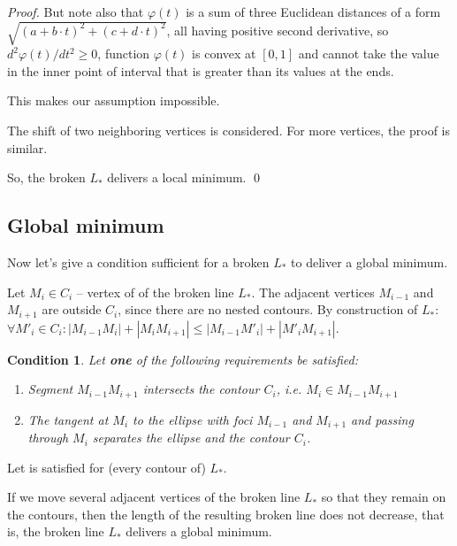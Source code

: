\documentclass[]{llncs}
\newtheorem{condition}{Condition}
\begin{document}
\begin{proof}
But note also
that
$\varphi(t)$ is a sum of three
Euclidean distances of a form
$\sqrt{(a+b\cdot t)^2 + (c+d \cdot t)^2}$,
all having positive second derivative,
so
$d^2\varphi(t)/dt^2 \ge 0$,
function
$\varphi(t)$ is convex at
$[0,1]$
and cannot take the value
in the inner point of interval
that is greater than its values
at the ends.

This makes our assumption impossible.

The shift of two neighboring vertices is considered. For more vertices, the proof is similar.

So, the broken
$L_*$
delivers a local minimum.
\qed
\end{proof}

\subsection{Global minimum}

Now let's give a condition sufficient
for a broken
$L_*$
to deliver a global minimum.

Let
$M_i \in C_i$ --
vertex of of the broken line
$L_*$.
The adjacent vertices
$M_{i-1}$
and
$M_{i+1}$
are outside
$C_i$,
since there are no nested contours.
By construction of
$L_*$:
$\forall M'_i \in C_i:
|M_{i-1} M_i|+|M_i M_{i+1}|
\le
|M_{i-1} M'_i|+|M'_i M_{i+1}|
$.

\begin{condition}
Let \textbf{one} of the following requirements be satisfied:
\begin{enumerate}
  \item
  Segment $M_{i-1} M_{i+1}$ intersects the contour
  $C_i$,
  i.e.
  $M_i \in M_{i-1} M_{i+1}$
  \item
  The tangent at
  $M_i$
  to the ellipse with foci
  $M_{i-1}$
  and
  $M_{i+1}$
  and passing through
  $M_i$
  separates the ellipse and the contour
  $C_i$.
\end{enumerate}
\end{condition}

\begin{proposition}
  Let 
  is satisfied for
  (every contour of)
  $L_*$.

  If we move several adjacent vertices of the broken line
  $L_*$ so that they remain on the contours,
  then the length of the resulting broken line does not decrease,
  that is, the broken line
  $L_*$ delivers a global minimum.
\end{proposition}
\end{document}
